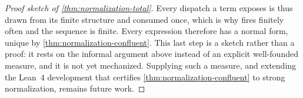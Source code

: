\begin{proof}[Proof sketch of \cref{thm:normalization-total}]
Every dispatch a term exposes is thus drawn from its finite structure and consumed
  once, which is why  fires finitely often and the sequence is
  finite.
Every expression therefore has a normal form, unique by
  \cref{thm:normalization-confluent}.
This last step is a sketch rather than a proof: it rests on the informal argument
  above instead of an explicit well-founded measure, and it is not yet mechanized.
Supplying such a measure, and extending the Lean~4 development that certifies
  \cref{thm:normalization-confluent} to strong normalization, remains future work.
\end{proof}
